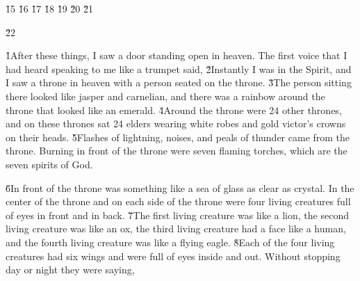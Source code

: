 \v{15} \v{16} \v{17} \v{18} \v{19} \v{20} \v{21}

\v{22}

\v{1}After these things, I saw a door standing open in heaven. The first voice that I had heard speaking to me like a trumpet said,  \v{2}Instantly I was in the Spirit, and I saw a throne in heaven with a person seated on the throne. \v{3}The person sitting there looked like jasper and carnelian, and there was a rainbow around the throne that looked like an emerald. \v{4}Around the throne were 24 other thrones, and on these thrones sat 24 elders wearing white robes and gold victor's crowns on their heads. \v{5}Flashes of lightning, noises, and peals of thunder came from the throne. Burning in front of the throne were seven flaming torches, which are the seven spirits of God.

\v{6}In front of the throne was something like a sea of glass as clear as crystal. In the center of the throne and on each side of the throne were four living creatures full of eyes in front and in back. \v{7}The first living creature was like a lion, the second living creature was like an ox, the third living creature had a face like a human, and the fourth living creature was like a flying eagle. \v{8}Each of the four living creatures had six wings and were full of eyes inside and out. Without stopping day or night they were saying,


